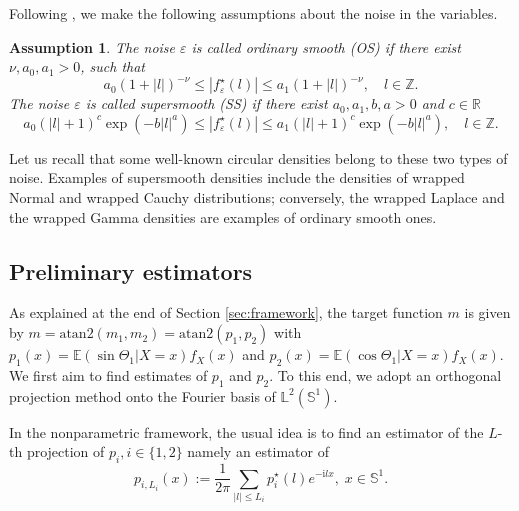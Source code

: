 \documentclass[11pt,a4paper,openany]{article}
\newtheorem{assumption}[thm]{Assumption}
\newcommand{\Atan}{\mbox{atan2}}
\def\Z{\mathbb{Z}}
\def\R{\mathbb{R}}
\def\E{\mathbb{E}}
\def\S{\mathbb{S}}
\def \compi{\mathrm{i}}
\begin{document}


Following \cite{Di-Marzio-Fensore-Panzera-Taylor:2020}, we make the following assumptions about the noise in the variables.
\begin{assumption}
The noise $\varepsilon$ is called ordinary smooth  (OS) if there exist $\nu, a_0, a_1 >0$, such that
\begin{equation}\label{OS-circle}
 a_0( 1+ |l|)^{-\nu} \leq  |f^{\star}_{\varepsilon}(l)| \leq a_1( 1+ |l|)^{-\nu}, \quad l \in \mathbb{Z}.
\end{equation}
The noise $\varepsilon$ is called supersmooth (SS) if there exist $a_0, a_1, b, a >0$ and $ c \in \R$
\begin{equation}\label{SS-circle}
a_0(|l| +1)^{c} \exp(-b |l|^a) \leq  |f^{\star}_{\varepsilon}(l)| \leq a_1(|l| +1)^{c} \exp(-b |l|^a), \quad l \in \mathbb{Z}.
\end{equation}
\end{assumption}

Let us recall that some well-known circular densities belong to these two types of noise. Examples of supersmooth densities include the densities of wrapped Normal and
wrapped Cauchy distributions; conversely, the wrapped Laplace and the wrapped Gamma densities are examples of ordinary smooth ones. 

%
\subsection{Preliminary estimators}

As explained at the end of Section \ref{sec:framework}, the target function $m$ is given by $m=\Atan (m_1,m_2)= \Atan(p_1, p_2)$ with 
$p_1(x)= \E (\sin \Theta_1 | X=x)f_X(x)$ and $p_2(x)= \E (\cos \Theta_1 | X=x)f_X(x)$. We first aim to find  estimates of $p_1$ and $p_2$. 
To this end, we adopt an orthogonal projection method onto the Fourier basis of $\mathbb{L}^2(\mathbb{S}^1)$. 

 In the nonparametric framework, the usual idea is to find an estimator of the $L$-th projection of $p_i, i \in \{1,2\}$ namely an estimator of 
$$
p_{i,L_i}(x):=\frac{1}{2\pi}\sum_{| l| \leq L _i} p_i^\star(l) e^{-\mathrm{i} l x}, \; x \in \S^1.
$$
\end{document}
